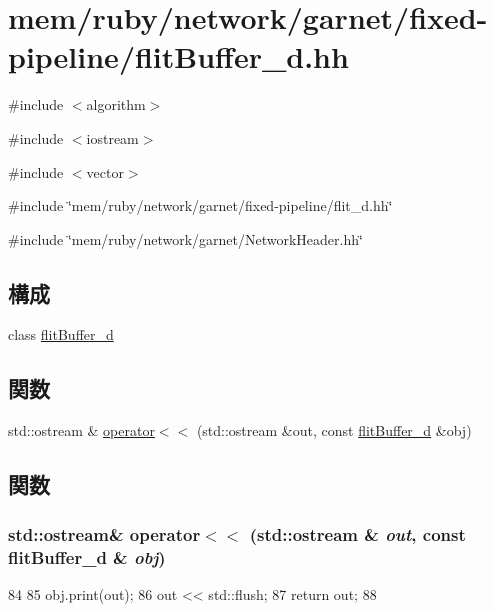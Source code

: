 \hypertarget{flitBuffer__d_8hh}{
\section{mem/ruby/network/garnet/fixed-\/pipeline/flitBuffer\_\-d.hh}
\label{flitBuffer__d_8hh}
}
{\ttfamily \#include $<$algorithm$>$}\par
{\ttfamily \#include $<$iostream$>$}\par
{\ttfamily \#include $<$vector$>$}\par
{\ttfamily \#include \char`\"{}mem/ruby/network/garnet/fixed-\/pipeline/flit\_\-d.hh\char`\"{}}\par
{\ttfamily \#include \char`\"{}mem/ruby/network/garnet/NetworkHeader.hh\char`\"{}}\par
\subsection*{構成}
\begin{DoxyCompactItemize}
\item 
class \hyperlink{classflitBuffer__d}{flitBuffer\_\-d}
\end{DoxyCompactItemize}
\subsection*{関数}
\begin{DoxyCompactItemize}
\item 
std::ostream \& \hyperlink{flitBuffer__d_8hh_a01c5a8d047d317e3f2475880c223c2d6}{operator$<$$<$} (std::ostream \&out, const \hyperlink{classflitBuffer__d}{flitBuffer\_\-d} \&obj)
\end{DoxyCompactItemize}


\subsection{関数}
\hypertarget{flitBuffer__d_8hh_a01c5a8d047d317e3f2475880c223c2d6}{
\subsubsection[{operator$<$$<$}]{\setlength{\rightskip}{0pt plus 5cm}std::ostream\& operator$<$$<$ (std::ostream \& {\em out}, \/  const {\bf flitBuffer\_\-d} \& {\em obj})}}
\label{flitBuffer__d_8hh_a01c5a8d047d317e3f2475880c223c2d6}



\begin{DoxyCode}
84 {
85     obj.print(out);
86     out << std::flush;
87     return out;
88 }
\end{DoxyCode}
